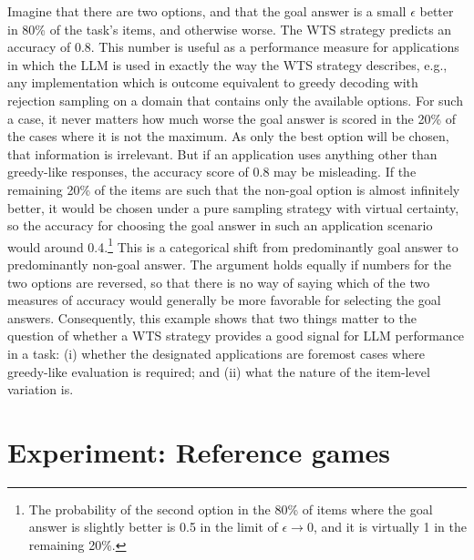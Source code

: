 \documentclass[fleqn]{article}
\begin{document}
Imagine that there are two options, and that the goal answer is a small $\epsilon$ better in 80\% of the task's items, and otherwise worse.
The WTS strategy predicts an accuracy of 0.8.
This number is useful as a performance measure for applications in which the LLM is used in exactly the way the WTS strategy describes, e.g., any implementation which is outcome equivalent to greedy decoding with rejection sampling on a domain that contains only the available options.
For such a case, it never matters how much worse the goal answer is scored in the 20\% of the cases where it is not the maximum.
As only the best option will be chosen, that information is irrelevant.
But if an application uses anything other than greedy-like responses, the accuracy score of 0.8 may be misleading.
If the remaining 20\% of the items are such that the non-goal option is almost infinitely better, it would be chosen under a pure sampling strategy with virtual certainty, so the accuracy for choosing the goal answer in such an application scenario would around 0.4.\footnote{The probability of the second option in the 80\% of items where the goal answer is slightly better is 0.5 in the limit of $\epsilon \rightarrow 0$, and it is virtually 1 in the remaining 20\%.}
This is a categorical shift from predominantly goal answer to predominantly non-goal answer.
The argument holds equally if numbers for the two options are reversed, so that there is no way of saying which of the two measures of accuracy would generally be more favorable for selecting the goal answers.
Consequently, this example shows that two things matter to the question of whether a WTS strategy provides a good signal for LLM performance in a task:
(i)
whether the designated applications are foremost cases where greedy-like evaluation is required; and
(ii)
what the nature of the item-level variation is.

\bigskip





\section{Experiment: Reference games}
\label{experiment-reference-games}
\end{document}
